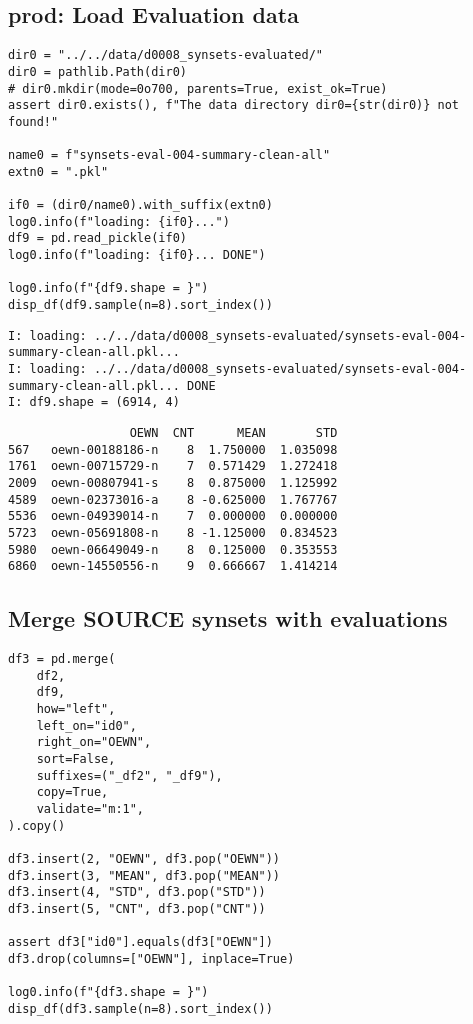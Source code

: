 \documentclass[a4paper,10pt,onecolumn,oneside,openright]{article}
\begin{document}
\subsection{prod: Load Evaluation data}
\label{sec:orga7d7ffc}
\begin{verbatim}
dir0 = "../../data/d0008_synsets-evaluated/"
dir0 = pathlib.Path(dir0)
# dir0.mkdir(mode=0o700, parents=True, exist_ok=True)
assert dir0.exists(), f"The data directory dir0={str(dir0)} not found!"

name0 = f"synsets-eval-004-summary-clean-all"
extn0 = ".pkl"

if0 = (dir0/name0).with_suffix(extn0)
log0.info(f"loading: {if0}...")
df9 = pd.read_pickle(if0)
log0.info(f"loading: {if0}... DONE")

log0.info(f"{df9.shape = }")
disp_df(df9.sample(n=8).sort_index())
\end{verbatim}

\begin{verbatim}
I: loading: ../../data/d0008_synsets-evaluated/synsets-eval-004-summary-clean-all.pkl...
I: loading: ../../data/d0008_synsets-evaluated/synsets-eval-004-summary-clean-all.pkl... DONE
I: df9.shape = (6914, 4)
\end{verbatim}
\begin{verbatim}
                 OEWN  CNT      MEAN       STD
567   oewn-00188186-n    8  1.750000  1.035098
1761  oewn-00715729-n    7  0.571429  1.272418
2009  oewn-00807941-s    8  0.875000  1.125992
4589  oewn-02373016-a    8 -0.625000  1.767767
5536  oewn-04939014-n    7  0.000000  0.000000
5723  oewn-05691808-n    8 -1.125000  0.834523
5980  oewn-06649049-n    8  0.125000  0.353553
6860  oewn-14550556-n    9  0.666667  1.414214
\end{verbatim}
\subsection{Merge SOURCE synsets with evaluations}
\label{sec:orgad6de85}
\begin{verbatim}
df3 = pd.merge(
    df2,
    df9,
    how="left",
    left_on="id0",
    right_on="OEWN",
    sort=False,
    suffixes=("_df2", "_df9"),
    copy=True,
    validate="m:1",
).copy()

df3.insert(2, "OEWN", df3.pop("OEWN"))
df3.insert(3, "MEAN", df3.pop("MEAN"))
df3.insert(4, "STD", df3.pop("STD"))
df3.insert(5, "CNT", df3.pop("CNT"))

assert df3["id0"].equals(df3["OEWN"])
df3.drop(columns=["OEWN"], inplace=True)

log0.info(f"{df3.shape = }")
disp_df(df3.sample(n=8).sort_index())
\end{verbatim}
\end{document}

